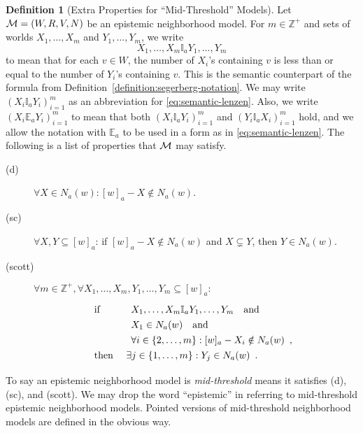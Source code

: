 \documentclass[12pt]{article}
\theoremstyle{definition}
\newtheorem{definition}[theorem]{Definition}
\newcommand{\Int}{\mathbb{Z}}  %
\newcommand{\M}{{\cal M}}      %
\newcommand{\Lang}{{\cal L}}   %
\newcommand{\KB}{{\mathsf{KB}}}                        %
\newcommand{\semn}[1]{\llbracket{#1}\rrbracket_{\mathsf{n}}} %
\begin{document}
\begin{definition}[Extra Properties for ``Mid-Threshold'' Models]
  \label{definition:extra-properties}
  Let $\M=(W,R,V,N)$ be an epistemic neighborhood model.  
  For $m\in\Int^+$ and sets
  of worlds $X_1,\dots,X_m$ and $Y_1,\dots,Y_m$,
  we write
  \begin{equation}
    X_1,\dots,X_m\mathbb{I}_aY_1,\dots,Y_m
    \label{eq:semantic-lenzen}
  \end{equation}
  to mean that for each $v\in W$, the number of $X_i$'s containing $v$
  is less than or equal to the number of $Y_i$'s containing $v$. This
  is the semantic counterpart of the formula from
  Definition~\ref{definition:segerberg-notation}.  We may write
  $(X_i\mathbb{I}_aY_i)_{i=1}^m$ as an abbreviation for
  \eqref{eq:semantic-lenzen}.  Also, we write
  $(X_i\mathbb{E}_aY_i)_{i=1}^m$ to mean that both
  $(X_i\mathbb{I}_aY_i)_{i=1}^m$ and $(Y_i\mathbb{I}_aX_i)_{i=1}^m$
  hold, and we allow the notation with $\mathbb{E}_a$ to be used in a
  form as in \eqref{eq:semantic-lenzen}.  The following is a list of
  properties that $\M$ may satisfy.
  \begin{description}
  \item[(d)] $\forall X \in N_a(w): [w]_a - X \notin  N_a(w)$.

 
  \item[(sc)] $\forall X,Y\subseteq[w]_a$: if $[w]_a-X\notin N_a(w)$
    and $X\subsetneq Y$, then $Y\in N_a(w)$.

  \item[(scott)] $\forall m\in\Int^+,\forall
    X_1,\dots,X_m,Y_1,\dots,Y_m\subseteq[w]_a:$
    \[
    \renewcommand{\arraystretch}{1.3}
    \begin{array}{ll}
      \text{if }
      &
      \begin{array}[t]{l}
        X_1,\dots,X_m\mathbb{I}_aY_1,\dots,Y_m\quad\text{and}
        \\
        X_1\in N_a(w)\quad\text{and}
        \\
        \forall i\in\{2,\dots,m\}:
        [w]_a-X_i\notin N_a(w) \enspace\text{,}
      \end{array}
      \\
      \text{then }
      &
      \exists j\in\{1,\dots,m\}: Y_j\in N_a(w)\enspace\text{.}
    \end{array}
    \]
  \end{description}
  To say an epistemic neighborhood model is \emph{mid-threshold} means
  it satisfies (d), (sc), and (scott).  We may drop the word
  ``epistemic'' in referring to mid-threshold epistemic neighborhood
  models.  Pointed versions of mid-threshold neighborhood models are
  defined in the obvious way.
\end{definition}
\end{document}

